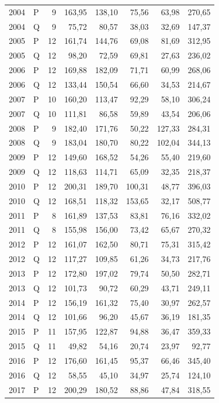 \begin{longtable}{llrrrrrr}
2004 & P & 9 & 163,95 & 138,10 & 75,56 & 63,98 & 270,65 \\
2004 & Q & 9 & 75,72 & 80,57 & 38,03 & 32,69 & 147,37 \\
2005 & P & 12 & 161,74 & 144,76 & 69,08 & 81,69 & 312,95 \\
2005 & Q & 12 & 98,20 & 72,59 & 69,81 & 27,63 & 236,02 \\
2006 & P & 12 & 169,88 & 182,09 & 71,71 & 60,99 & 268,06 \\
2006 & Q & 12 & 133,44 & 150,54 & 66,60 & 34,53 & 214,67 \\
2007 & P & 10 & 160,20 & 113,47 & 92,29 & 58,10 & 306,24 \\
2007 & Q & 10 & 111,81 & 86,58 & 59,89 & 43,54 & 206,06 \\
2008 & P & 9 & 182,40 & 171,76 & 50,22 & 127,33 & 284,31 \\
2008 & Q & 9 & 183,04 & 180,70 & 80,22 & 102,04 & 344,13 \\
2009 & P & 12 & 149,60 & 168,52 & 54,26 & 55,40 & 219,60 \\
2009 & Q & 12 & 118,63 & 114,71 & 65,09 & 32,35 & 218,37 \\
2010 & P & 12 & 200,31 & 189,70 & 100,31 & 48,77 & 396,03 \\
2010 & Q & 12 & 168,51 & 118,32 & 153,65 & 32,17 & 508,77 \\
2011 & P & 8 & 161,89 & 137,53 & 83,81 & 76,16 & 332,02 \\
2011 & Q & 8 & 155,98 & 156,00 & 73,42 & 65,67 & 270,32 \\
2012 & P & 12 & 161,07 & 162,50 & 80,71 & 75,31 & 315,42 \\
2012 & Q & 12 & 117,27 & 109,85 & 61,26 & 34,73 & 217,76 \\
2013 & P & 12 & 172,80 & 197,02 & 79,74 & 50,50 & 282,71 \\
2013 & Q & 12 & 101,73 & 90,72 & 60,29 & 43,71 & 249,11 \\
2014 & P & 12 & 156,19 & 161,32 & 75,40 & 30,97 & 262,57 \\
2014 & Q & 12 & 101,66 & 96,20 & 45,67 & 36,19 & 181,35 \\
2015 & P & 11 & 157,95 & 122,87 & 94,88 & 36,47 & 359,33 \\
2015 & Q & 11 & 49,82 & 54,16 & 20,74 & 23,97 & 92,77 \\
2016 & P & 12 & 176,60 & 161,45 & 95,37 & 66,46 & 345,40 \\
2016 & Q & 12 & 58,55 & 45,10 & 34,97 & 25,74 & 124,10 \\
2017 & P & 12 & 200,29 & 180,52 & 88,86 & 47,84 & 318,55 \\

\end{longtable}
